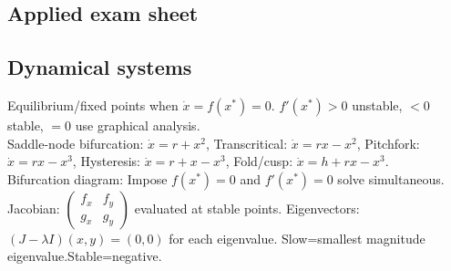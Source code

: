 \documentclass[1pt]{article}
\begin{document}
\begin{center}
\section*{Applied exam sheet}
\end{center}


\subsection*{Dynamical systems}
Equilibrium/fixed points when $\dot{x}=f(x^*)=0$. $f'(x^*)>0$ unstable, $<0$ stable, $=0$ use graphical analysis.
\\Saddle-node bifurcation: $\dot{x}=r+x^2$, Transcritical: $\dot{x}=rx-x^2$, Pitchfork: $\dot{x}=rx-x^3$, Hysteresis: $\dot{x}=r+x-x^3$, Fold/cusp: $\dot{x}=h+rx-x^3$.
\\Bifurcation diagram: Impose $f(x^*)=0$ and $f'(x^*)=0$ solve simultaneous.
\\ Jacobian: $\begin{pmatrix}
f_x & f_y \\
g_x & g_y
\end{pmatrix}$ evaluated at stable points. Eigenvectors: $(J-\lambda I)(x,y)=(0,0)$ for each eigenvalue. Slow=smallest magnitude eigenvalue.Stable=negative. 
\end{document}
